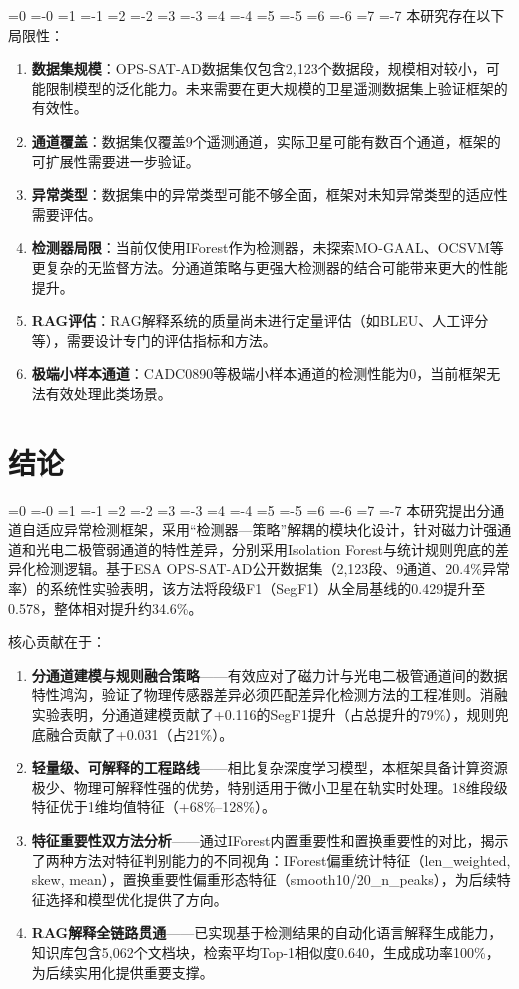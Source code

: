 \documentclass[12pt, a4paper]{article}
\newcommand{\zihao}[1]{%
    \ifnum#1=0 {\fontsize{42pt}{50pt}\selectfont}%
    \else\ifnum#1=-0 {\fontsize{36pt}{44pt}\selectfont}%
    \else\ifnum#1=1 {\fontsize{26pt}{32pt}\selectfont}%
    \else\ifnum#1=-1 {\fontsize{24pt}{28pt}\selectfont}%
    \else\ifnum#1=2 {\fontsize{22pt}{26pt}\selectfont}%
    \else\ifnum#1=-2 {\fontsize{18pt}{22pt}\selectfont}%
    \else\ifnum#1=3 {\fontsize{16pt}{20pt}\selectfont}%
    \else\ifnum#1=-3 {\fontsize{15pt}{18pt}\selectfont}%
    \else\ifnum#1=4 {\fontsize{14pt}{17pt}\selectfont}%
    \else\ifnum#1=-4 {\fontsize{12pt}{15pt}\selectfont}%
    \else\ifnum#1=5 {\fontsize{10.5pt}{13pt}\selectfont}%
    \else\ifnum#1=-5 {\fontsize{9pt}{11pt}\selectfont}%
    \else\ifnum#1=6 {\fontsize{7.5pt}{9pt}\selectfont}%
    \else\ifnum#1=-6 {\fontsize{6.5pt}{8pt}\selectfont}%
    \else\ifnum#1=7 {\fontsize{5.5pt}{7pt}\selectfont}%
    \else\ifnum#1=-7 {\fontsize{5pt}{6pt}\selectfont}%
    \fi\fi\fi\fi\fi\fi\fi\fi\fi\fi\fi\fi\fi\fi\fi\fi
}
\newcommand{\songti}{\CJKfontspec{SimSun}}
\begin{document}
\zihao{5}\songti
本研究存在以下局限性：

\begin{enumerate}[label=(\arabic*)]
    \item \textbf{数据集规模}：OPS-SAT-AD数据集仅包含2,123个数据段，规模相对较小，可能限制模型的泛化能力。未来需要在更大规模的卫星遥测数据集上验证框架的有效性。
    \item \textbf{通道覆盖}：数据集仅覆盖9个遥测通道，实际卫星可能有数百个通道，框架的可扩展性需要进一步验证。
    \item \textbf{异常类型}：数据集中的异常类型可能不够全面，框架对未知异常类型的适应性需要评估。
    \item \textbf{检测器局限}：当前仅使用IForest作为检测器，未探索MO-GAAL、OCSVM等更复杂的无监督方法。分通道策略与更强大检测器的结合可能带来更大的性能提升。
    \item \textbf{RAG评估}：RAG解释系统的质量尚未进行定量评估（如BLEU、人工评分等），需要设计专门的评估指标和方法。
    \item \textbf{极端小样本通道}：CADC0890等极端小样本通道的检测性能为0，当前框架无法有效处理此类场景。
\end{enumerate}

\section{结论}

\zihao{5}\songti
本研究提出分通道自适应异常检测框架，采用``检测器—策略''解耦的模块化设计，针对磁力计强通道和光电二极管弱通道的特性差异，分别采用Isolation Forest与统计规则兜底的差异化检测逻辑。基于ESA OPS-SAT-AD公开数据集（2,123段、9通道、20.4\%异常率）的系统性实验表明，该方法将段级F1（SegF1）从全局基线的0.429提升至0.578，整体相对提升约34.6\%。

核心贡献在于：

\begin{enumerate}[label=(\arabic*)]
    \item \textbf{分通道建模与规则融合策略}——有效应对了磁力计与光电二极管通道间的数据特性鸿沟，验证了物理传感器差异必须匹配差异化检测方法的工程准则。消融实验表明，分通道建模贡献了+0.116的SegF1提升（占总提升的79\%），规则兜底融合贡献了+0.031（占21\%）。
    \item \textbf{轻量级、可解释的工程路线}——相比复杂深度学习模型，本框架具备计算资源极少、物理可解释性强的优势，特别适用于微小卫星在轨实时处理。18维段级特征优于1维均值特征（+68\%--128\%）。
    \item \textbf{特征重要性双方法分析}——通过IForest内置重要性和置换重要性的对比，揭示了两种方法对特征判别能力的不同视角：IForest偏重统计特征（len\_weighted, skew, mean），置换重要性偏重形态特征（smooth10/20\_n\_peaks），为后续特征选择和模型优化提供了方向。
    \item \textbf{RAG解释全链路贯通}——已实现基于检测结果的自动化语言解释生成能力，知识库包含5,062个文档块，检索平均Top-1相似度0.640，生成成功率100\%，为后续实用化提供重要支撑。
\end{enumerate}
\end{document}
